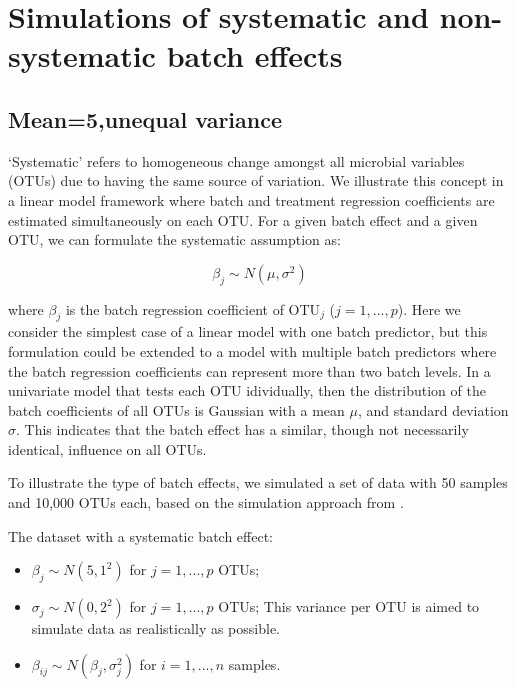 \documentclass[]{book}
\providecommand{\tightlist}{%
  \setlength{\itemsep}{0pt}\setlength{\parskip}{0pt}}
\begin{document}
\chapter{Simulations of systematic and non-systematic batch
effects}\label{simu}

\section{Mean=5,unequal variance}\label{mean5unequal-variance}

`Systematic' refers to homogeneous change amongst all microbial
variables (OTUs) due to having the same source of variation. We
illustrate this concept in a linear model framework where batch and
treatment regression coefficients are estimated simultaneously on each
OTU. For a given batch effect and a given OTU, we can formulate the
systematic assumption as:

\[\beta_{j} \sim N(\mu,\sigma^{2})\]

where \(\beta_{j}\) is the batch regression coefficient of OTU\(_{j}\)
(\(j = 1,...,p\)). Here we consider the simplest case of a linear model
with one batch predictor, but this formulation could be extended to a
model with multiple batch predictors where the batch regression
coefficients can represent more than two batch levels. In a univariate
model that tests each OTU idividually, then the distribution of the
batch coefficients of all OTUs is Gaussian with a mean \(\mu\), and
standard deviation \(\sigma\). This indicates that the batch effect has
a similar, though not necessarily identical, influence on all OTUs.

To illustrate the type of batch effects, we simulated a set of data with
50 samples and 10,000 OTUs each, based on the simulation approach from
\citep{gagnon2013removing}.

The dataset with a systematic batch effect:

\begin{itemize}
\tightlist
\item
  \(\beta_{j} \sim N(5,1^{2})\) for \(j=1,...,p\) OTUs;\\
\item
  \(\sigma_{j} \sim N(0,2^{2})\) for \(j=1,...,p\) OTUs; This variance
  per OTU is aimed to simulate data as realistically as possible.\\
\item
  \(\beta_{ij} \sim N(\beta_{j}, \sigma_{j}^{2})\) for \(i = 1,...,n\)
  samples.
\end{itemize}
\end{document}
